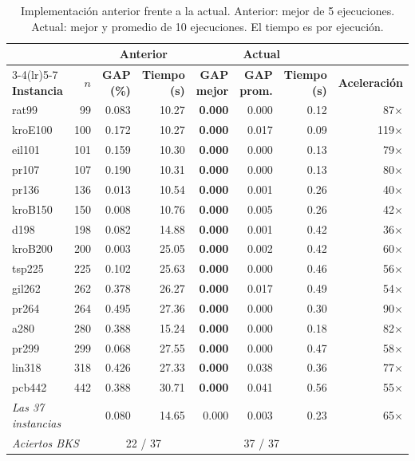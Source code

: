\documentclass[runningheads]{llncs}
\begin{document}
\begin{table}
\caption{Implementación anterior frente a la actual. Anterior: mejor de 5
ejecuciones. Actual: mejor y promedio de 10 ejecuciones. El tiempo es por
ejecución.}
\label{tab:cmp}
\centering\scriptsize
\begin{tabular}{@{}lrrrrrrr@{}}
\toprule
& & \multicolumn{2}{c}{\textbf{Anterior}} & \multicolumn{3}{c}{\textbf{Actual}} & \\
\cmidrule(lr){3-4}\cmidrule(lr){5-7}
\textbf{Instancia} & $n$ & \textbf{GAP (\%)} & \textbf{Tiempo (s)} & \textbf{GAP mejor} & \textbf{GAP prom.} & \textbf{Tiempo (s)} & \textbf{Aceleración}\\
\midrule
rat99 & 99 & 0.083 & 10.27 & \textbf{0.000} & 0.000 & 0.12 & 87$\times$ \\
kroE100 & 100 & 0.172 & 10.27 & \textbf{0.000} & 0.017 & 0.09 & 119$\times$ \\
eil101 & 101 & 0.159 & 10.30 & \textbf{0.000} & 0.000 & 0.13 & 79$\times$ \\
pr107 & 107 & 0.190 & 10.31 & \textbf{0.000} & 0.000 & 0.13 & 80$\times$ \\
pr136 & 136 & 0.013 & 10.54 & \textbf{0.000} & 0.001 & 0.26 & 40$\times$ \\
kroB150 & 150 & 0.008 & 10.76 & \textbf{0.000} & 0.005 & 0.26 & 42$\times$ \\
d198 & 198 & 0.082 & 14.88 & \textbf{0.000} & 0.001 & 0.42 & 36$\times$ \\
kroB200 & 200 & 0.003 & 25.05 & \textbf{0.000} & 0.002 & 0.42 & 60$\times$ \\
tsp225 & 225 & 0.102 & 25.63 & \textbf{0.000} & 0.000 & 0.46 & 56$\times$ \\
gil262 & 262 & 0.378 & 26.27 & \textbf{0.000} & 0.017 & 0.49 & 54$\times$ \\
pr264 & 264 & 0.495 & 27.36 & \textbf{0.000} & 0.000 & 0.30 & 90$\times$ \\
a280 & 280 & 0.388 & 15.24 & \textbf{0.000} & 0.000 & 0.18 & 82$\times$ \\
pr299 & 299 & 0.068 & 27.55 & \textbf{0.000} & 0.000 & 0.47 & 58$\times$ \\
lin318 & 318 & 0.426 & 27.33 & \textbf{0.000} & 0.038 & 0.36 & 77$\times$ \\
pcb442 & 442 & 0.388 & 30.71 & \textbf{0.000} & 0.041 & 0.56 & 55$\times$ \\
\midrule
\multicolumn{2}{l}{\textit{Las 37 instancias}} & 0.080 & 14.65 & 0.000 & 0.003 & 0.23 & 65$\times$ \\
\multicolumn{2}{l}{\textit{Aciertos BKS}} & \multicolumn{2}{c}{22 / 37} & \multicolumn{3}{c}{37 / 37} & \\
\bottomrule
\end{tabular}
\end{table}
\end{document}
